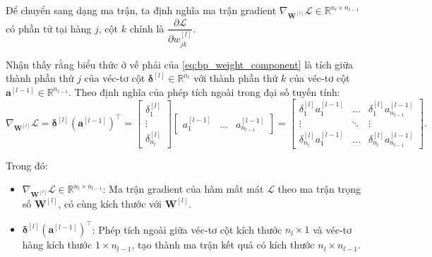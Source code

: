 Để chuyển sang dạng ma trận, ta định nghĩa ma trận gradient $\nabla_{\mathbf{W}^{[l]}}\mathcal{L} \in \mathbb{R}^{n_l \times n_{l-1}}$ có phần tử tại hàng $j$, cột $k$ chính là $\dfrac{\partial\mathcal{L}}{\partial w_{jk}^{[l]}}$. 

Nhận thấy rằng biểu thức ở vế phải của \eqref{eq:bp_weight_component} là tích giữa thành phần thứ $j$ của véc-tơ cột $\boldsymbol{\delta}^{[l]} \in \mathbb{R}^{n_l}$ với thành phần thứ $k$ của véc-tơ cột $\mathbf{a}^{[l-1]} \in \mathbb{R}^{n_{l-1}}$. Theo định nghĩa của phép tích ngoài trong đại số tuyến tính:
\begin{equation}
\nabla_{\mathbf{W}^{[l]}}\mathcal{L} = \boldsymbol{\delta}^{[l]} \left(\mathbf{a}^{[l-1]}\right)^\top =
\begin{bmatrix}
\delta_1^{[l]} \\[6pt]
\vdots \\
\delta_{n_l}^{[l]}
\end{bmatrix}
\begin{bmatrix}
a_1^{[l-1]} & \dots & a_{n_{l-1}}^{[l-1]}
\end{bmatrix}
=
\begin{bmatrix}
\delta_1^{[l]} a_1^{[l-1]} & \dots & \delta_1^{[l]} a_{n_{l-1}}^{[l-1]} \\[6pt]
\vdots & \ddots & \vdots \\
\delta_{n_l}^{[l]} a_1^{[l-1]} & \dots & \delta_{n_l}^{[l]} a_{n_{l-1}}^{[l-1]}
\end{bmatrix}.
\end{equation}

Trong đó:
\begin{itemize}
    \item $\nabla_{\mathbf{W}^{[l]}}\mathcal{L} \in \mathbb{R}^{n_l \times n_{l-1}}$: Ma trận gradient của hàm mất mát $\mathcal{L}$ theo ma trận trọng số $\mathbf{W}^{[l]}$, có cùng kích thước với $\mathbf{W}^{[l]}$.
    \item $\boldsymbol{\delta}^{[l]} \left(\mathbf{a}^{[l-1]}\right)^\top$: Phép tích ngoài giữa véc-tơ cột kích thước $n_l \times 1$ và véc-tơ hàng kích thước $1 \times n_{l-1}$, tạo thành ma trận kết quả có kích thước $n_l \times n_{l-1}$.
\end{itemize}

